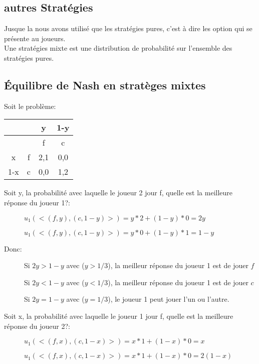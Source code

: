 \subsection{autres Stratégies}
Jusque la nous avons utilisé que les stratégies pures, c'est à dire les option qui se présente au joueurs.\\
Une stratégies mixte est une distribution de probabilité sur l'ensemble des stratégies pures.\\

\subsection{Équilibre de Nash en stratèges mixtes}
Soit le problème:
\begin{tabular}{cc|cc}
$ $ &$ $ & y & 1-y\\
\hline
$ $& $ $ & f & c\\
\hline
x & f & 2,1 & 0,0\\
1-x & c & 0,0 & 1,2\\
\end{tabular}

Soit y, la probabilité avec laquelle le joueur 2 jour f, quelle est la meilleure réponse du joueur 1?:
\begin{description}
\item[] $u_1(<(f, y), (c, 1-y)>) = y*2 + (1-y)*0 = 2y$
\item[] $u_1(<(f, y), (c, 1-y)>) = y*0 + (1-y)*1 = 1-y$
\end{description}

Donc:
\begin{description}
\item[] Si $2y > 1 - y$ avec ($y > 1/3$), la meilleur réponse du joueur 1 est de jouer $f$
\item[] Si $2y < 1 - y$ avec ($y < 1/3$), la meilleur réponse du joueur 1 est de jouer $c$
\item[] Si $2y = 1 - y$ avec ($y = 1/3$), le joueur 1 peut jouer l'un ou l'autre.
\end{description}

Soit x, la probabilité avec laquelle le joueur 1 jour f, quelle est la meilleure réponse du joueur 2?:
\begin{description}
\item[] $u_1(<(f, x), (c, 1-x)>) = x*1+(1-x)*0 = x$
\item[] $u_1(<(f, x), (c, 1-x)>) = x*1+(1-x)*0 = 2(1-x)$
\end{description}

